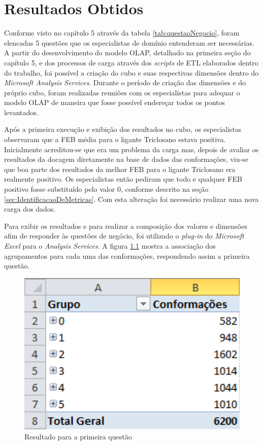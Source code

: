 \chapter{Resultados Obtidos}
\label{cap:ResultadosObtidos}

Conforme visto no capítulo 5 através da tabela \ref{tab:questaoNegocio}, foram elencadas 5 questões que os especialistas de domínio entenderam ser necessárias. A partir do desenvolvimento do modelo OLAP, detalhado na primeira seção do capítulo 5, e dos processos de carga através dos \emph{scripts} de ETL elaborados dentro do trabalho, foi possível a criação do cubo e suas respectivas dimensões dentro do \emph{Microsoft Analysis Services}. Durante o período de criação das dimensões e do próprio cubo, foram realizadas reuniões com os especialistas para adequar o modelo OLAP de maneira que fosse possível endereçar todos os pontos levantados. 

Após a primeira execução e exibição dos resultados no cubo, os especialistas observaram que a FEB média para o ligante Triclosano estava positiva. Inicialmente acreditou-se que era um problema da carga mas, depois de avaliar os resultados da docagem diretamente na base de dados das conformações, viu-se que boa parte dos resultados da melhor FEB para o ligante Triclosano era realmente positivo. Os especialistas então pediram que todo e qualquer FEB positivo fosse substituído pelo valor 0, conforme descrito na seção \ref{sec:IdentificacaoDeMetricas}. Com esta alteração foi necessário realizar uma nova carga dos dados.

Para exibir os resultados e para realizar a composição dos valores e dimensões afim de responder às questões de negócio, foi utilizado o \emph{plug-in} do \emph{Microsoft Excel} para o \emph{Analysis Services}. A figura \ref{fig:questao1} mostra a associação dos agrupamentos para cada uma das conformações, respondendo assim a primeira questão. 

\begin{figure}[h]
        \center
        \includegraphics[width=14cm]{images/Questao1.PNG}
        \caption{Resultado para a primeira questão}
        \label{fig:questao1}
\end{figure}

